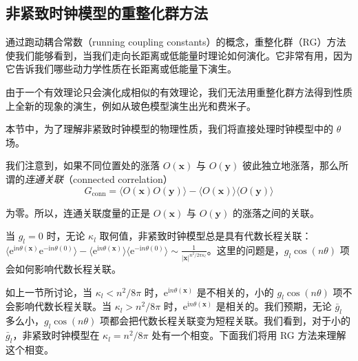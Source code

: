 \subsection{非紧致时钟模型的重整化群方法}
\begin{keypoints}
\item 通过跑动耦合常数（running coupling constants）的概念，重整化群（RG）方法使我们能够看到，当我们走向长距离或低能量时理论如何演化。它非常有用，因为它告诉我们哪些动力学性质在长距离或低能量下演生。
\item 由于一个有效理论只会演化成相似的有效理论，我们无法用重整化群方法得到性质上全新的现象的演生，例如从玻色模型演生出光和费米子。
\end{keypoints}

本节中，为了理解非紧致时钟模型的物理性质，我们将直接处理时钟模型中的 $\theta$ 场。

我们注意到，如果不同位置处的涨落 $O(\pmb{x})$ 与 $O(\pmb{y})$ 彼此独立地涨落，那么所谓的\emph{连通关联}（connected correlation）
\begin{equation*}
G_{\mathrm{conn}} = \langle O(\pmb{x})O(\pmb{y})\rangle - \langle O(\pmb{x})\rangle\langle O(\pmb{y})\rangle
\end{equation*}

为零。所以，连通关联度量的正是 $O(\pmb{x})$ 与 $O(\pmb{y})$ 的涨落之间的关联。

当 $g_{l} = 0$ 时，无论 $\kappa_{l}$ 取何值，非紧致时钟模型总是具有代数长程关联：$\langle \mathrm{e}^{\mathrm{i}n\theta(\pmb{x})}\mathrm{e}^{-\mathrm{i}n\theta(0)}\rangle - \langle \mathrm{e}^{\mathrm{i}n\theta(\pmb{x})}\rangle\langle \mathrm{e}^{-\mathrm{i}n\theta(0)}\rangle \sim \frac{1}{|\pmb{x}|^{n^{2}/2\pi\kappa_{l}}}$。这里的问题是，$g_{l}\cos(n\theta)$ 项会如何影响代数长程关联。

如上一节所讨论，当 $\kappa_{l} < n^{2}/8\pi$ 时，$\mathrm{e}^{\mathrm{i}n\theta(\pmb{x})}$ 是不相关的，小的 $g_{l}\cos(n\theta)$ 项不会影响代数长程关联。当 $\kappa_{l} > n^{2}/8\pi$ 时，$\mathrm{e}^{\mathrm{i}n\theta(\pmb{x})}$ 是相关的。我们预期，无论 $\bar{g}_{l}$ 多么小，$g_{l}\cos(n\theta)$ 项都会把代数长程关联变为短程关联。我们看到，对于小的 $\bar{g}_{l}$，非紧致时钟模型在 $\kappa_{l} = n^{2}/8\pi$ 处有一个相变。下面我们将用 RG 方法来理解这个相变。

